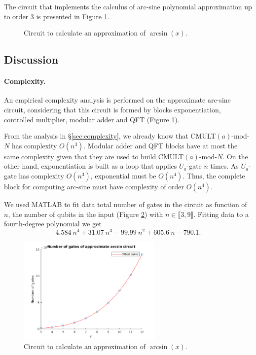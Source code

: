 \documentclass[a4paper, 10pt]{article}
\numberwithin{equation}{section}
\numberwithin{figure}{section}
\numberwithin{table}{section}
\begin{document}
The circuit that implements the calculus of arc-sine polynomial approximation up to order 3 is presented in Figure \ref{fig:arcsin}.

\begin{figure}[h!]
	\centering
	\caption{Circuit to calculate an approximation of $\arcsin(x)$.}
	\label{fig:arcsin}
\end{figure}

\subsection{Discussion}

\paragraph{Complexity.}
An empirical complexity analysis is performed on the approximate arc-sine circuit, considering that this circuit is formed by blocks exponentiation, controlled multiplier, modular adder and QFT (Figure \ref{fig:arcsin}).

From the analysis in \S \ref{sec:complexity}, we already know that CMULT$(a)$-mod-$N$ has complexity $O(n^3)$. Modular adder and QFT blocks have at most the same complexity given that they are used to build CMULT$(a)$-mod-$N$. On the other hand, exponentiation is built as a loop that applies $U_a$-gate $n$ times. As $U_a$-gate has complexity $O(n^3)$, exponential must be $O(n^4)$. Thus, the complete block for computing arc-sine must have complexity of order $O(n^4)$.

We used MATLAB to fit data total number of gates in the circuit as function of $n$, the number of qubits in the input (Figure \ref{fig:data-arcsin}) with $n\in\llbracket 3, 9\rrbracket$. Fitting data to a fourth-degree polynomial we get
\begin{equation*}
	4.584\ n^4 + 31.07\ n^3 -99.99\ n^2 + 605.6\ n - 790.1.
\end{equation*}

\begin{figure}[h!]
	\centering
	\includegraphics[width=7cm]{Figures/data-arcsin}
	\caption{Circuit to calculate an approximation of $\arcsin(x)$.}
	\label{fig:data-arcsin}
\end{figure}
\end{document}
